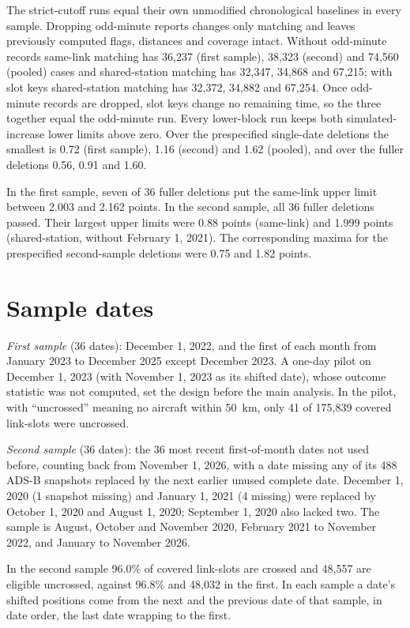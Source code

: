\documentclass[11pt]{article}
\begin{document}
\begin{appendices}
The strict-cutoff runs equal their own unmodified chronological baselines in every sample. Dropping odd-minute reports changes only matching and leaves previously computed flags, distances and coverage intact. Without odd-minute records same-link matching has 36{,}237 (first sample), 38{,}323 (second) and 74{,}560 (pooled) cases and shared-station matching has 32{,}347, 34{,}868 and 67{,}215; with slot keys shared-station matching has 32{,}372, 34{,}882 and 67{,}254. Once odd-minute records are dropped, slot keys change no remaining time, so the three together equal the odd-minute run. Every lower-block run keeps both simulated-increase lower limits above zero. Over the prespecified single-date deletions the smallest is 0.72 (first sample), 1.16 (second) and 1.62 (pooled), and over the fuller deletions 0.56, 0.91 and 1.60.

In the first sample, seven of 36 fuller deletions put the same-link upper limit between 2.003 and 2.162 points. In the second sample, all 36 fuller deletions passed. Their largest upper limits were 0.88 points (same-link) and 1.999 points (shared-station, without February 1, 2021). The corresponding maxima for the prespecified second-sample deletions were 0.75 and 1.82 points.

\section{Sample dates}\label{app:dates}
\emph{First sample} (36 dates): December 1, 2022, and the first of each month from January 2023 to December 2025 except December 2023. A one-day pilot on December 1, 2023 (with November 1, 2023 as its shifted date), whose outcome statistic was not computed, set the design before the main analysis. In the pilot, with ``uncrossed'' meaning no aircraft within 50~km, only 41 of 175{,}839 covered link-slots were uncrossed.

\emph{Second sample} (36 dates): the 36 most recent first-of-month dates not used before, counting back from November 1, 2026, with a date missing any of its 488 ADS-B snapshots replaced by the next earlier unused complete date. December 1, 2020 (1 snapshot missing) and January 1, 2021 (4 missing) were replaced by October 1, 2020 and August 1, 2020; September 1, 2020 also lacked two. The sample is August, October and November 2020, February 2021 to November 2022, and January to November 2026.

In the second sample 96.0\% of covered link-slots are crossed and 48{,}557 are eligible uncrossed, against 96.8\% and 48{,}032 in the first. In each sample a date's shifted positions come from the next and the previous date of that sample, in date order, the last date wrapping to the first.

\end{appendices}
\end{document}
